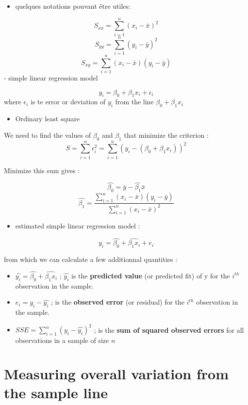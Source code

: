 \documentclass[
]{report}
\providecommand{\tightlist}{%
  \setlength{\itemsep}{0pt}\setlength{\parskip}{0pt}}
\begin{document}
\begin{itemize}
\tightlist
\item
  quelques notations pouvant être utiles:
\end{itemize}

\[S_{xx} = \sum_{i=1}^n(x_i -\bar{x})^2 \]
\[S_{yy} = \sum_{i=1}^n(y_i -\bar{y})^2 \]
\[S_{xy} = \sum_{i=1}^n(x_i -\bar{x})(y_i -\bar{y}) \]
- simple linear regression model

\[y_i = \beta_0 + \beta_1x_i +  \epsilon_i\]
where \(\epsilon_i\) is te error or deviation of \(y_i\) from the line \(\beta_0 + \beta_1x_i\)

\begin{itemize}
\tightlist
\item
  Ordinary least square
\end{itemize}

We need to find the values of \(\beta_0\) and \(\beta_1\) that minimize the criterion :
\[S = \sum_{i=1}^n \epsilon_i^2 = \sum_{i=1}^n (y_i - (\beta_0 + \beta_1x_i))^2\]

Minimize this sum gives :

\[\hat{\beta_0}= \bar{y} - \hat{\beta_1}\bar{x}\]
\[\hat{\beta_1}= \frac{\sum_{i=1}^n(x_i -\bar{x})(y_i -\bar{y})}{\sum_{i=1}^n(x_i -\bar{x})^2}\]

\begin{itemize}
\tightlist
\item
  estimated simple linear regression model :
\end{itemize}

\[y_i = \hat{\beta_0} + \hat{\beta_1x_i} +  e_i\]

from which we can calculate a few additionnal quantities :

\begin{itemize}
\item
  \(\hat{y_i} = \hat{\beta_0} + \hat{\beta_1x_i}\) ; \(\hat{y_i}\) is the \textbf{predicted value} (or predicted fit) of y for the \(i^{th}\) observation in the sample.
\item
  \(e_i=y_i -\hat{y_i}\) ; is the \textbf{observed error} (or residual) for the \(i^{th}\) observation in the sample.
\item
  \(SSE = \sum_{i=1}^n (y_i -\hat{y_i})^2\) ; is the \textbf{sum of squared observed errors} for all observations in a sample of size \(n\)
\end{itemize}

\hypertarget{measuring-overall-variation-from-the-sample-line}{%
\section{Measuring overall variation from the sample line}\label{measuring-overall-variation-from-the-sample-line}}
\end{document}
